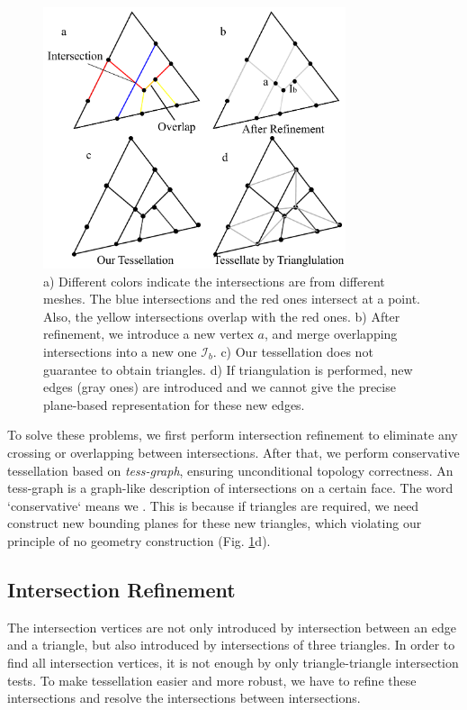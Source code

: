 \documentclass[10pt,journal,compsoc]{IEEEtran}
\begin{document}
\begin{figure}[t]
\centering
\includegraphics[width=3.5in]{iisect}
\caption{a) Different colors indicate the intersections are from different meshes. The blue intersections and the red ones intersect at a point. Also, the yellow intersections overlap with the red ones. b) After refinement, we introduce a new vertex $a$, and merge overlapping intersections into a new one $\mathcal{I}_b$. c) Our tessellation does not guarantee to obtain triangles. d) If triangulation is performed, new edges (gray ones) are introduced and we cannot give the precise plane-based representation for these new edges.}
\label{fig:iisect}
\end{figure}

To solve these problems, we first perform intersection refinement to eliminate any crossing or overlapping between intersections. After that, we perform conservative tessellation based on \emph{tess-graph}, ensuring unconditional topology correctness. An tess-graph is a graph-like description of intersections on a certain face. The word `conservative` means we . This is because if triangles are required, we need construct new bounding planes for these new triangles, which violating our principle of no geometry construction (Fig. \ref{fig:iisect}d).

\subsection{Intersection Refinement}


The intersection vertices are not only introduced by intersection between an edge and a triangle, but also introduced by intersections of three triangles. In order to find all intersection vertices, it is not enough by only triangle-triangle intersection tests. To make tessellation easier and more robust, we have to refine these intersections and resolve the intersections between intersections.
\end{document}
